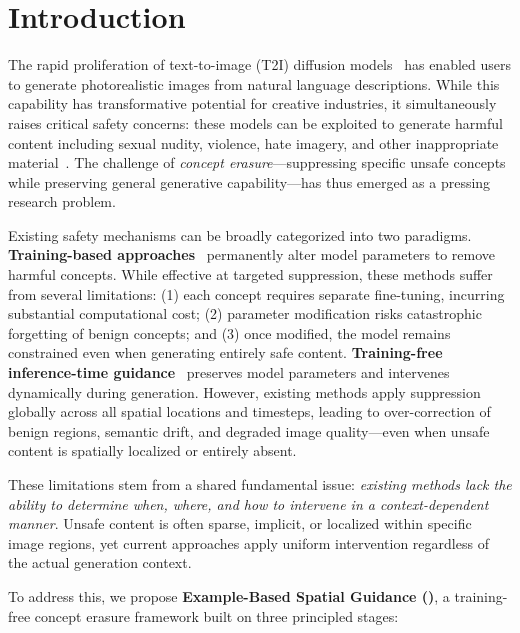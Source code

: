 \section{Introduction}

The rapid proliferation of text-to-image (T2I) diffusion models~\citep{rombach2022high,ramesh2022hierarchical} has enabled users to generate photorealistic images from natural language descriptions. While this capability has transformative potential for creative industries, it simultaneously raises critical safety concerns: these models can be exploited to generate harmful content including sexual nudity, violence, hate imagery, and other inappropriate material~\citep{rando2022red,schramowski2023safe,qu2023unsafe}. The challenge of \emph{concept erasure}---suppressing specific unsafe concepts while preserving general generative capability---has thus emerged as a pressing research problem.

Existing safety mechanisms can be broadly categorized into two paradigms. \textbf{Training-based approaches}~\citep{gandikota2023erasing,kim2023towards,gandikota2024unified,gong2024reliable} permanently alter model parameters to remove harmful concepts. While effective at targeted suppression, these methods suffer from several limitations: (1) each concept requires separate fine-tuning, incurring substantial computational cost; (2) parameter modification risks catastrophic forgetting of benign concepts; and (3) once modified, the model remains constrained even when generating entirely safe content.
\textbf{Training-free inference-time guidance}~\citep{schramowski2023safe,brack2023sega,yoon2024safree} preserves model parameters and intervenes dynamically during generation. However, existing methods apply suppression globally across all spatial locations and timesteps, leading to over-correction of benign regions, semantic drift, and degraded image quality---even when unsafe content is spatially localized or entirely absent.

These limitations stem from a shared fundamental issue: \emph{existing methods lack the ability to determine when, where, and how to intervene in a context-dependent manner}. Unsafe content is often sparse, implicit, or localized within specific image regions, yet current approaches apply uniform intervention regardless of the actual generation context.

To address this, we propose \textbf{Example-Based Spatial Guidance (\ours{})}, a training-free concept erasure framework built on three principled stages:


